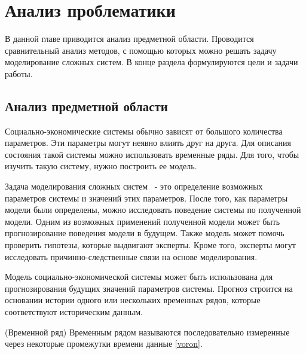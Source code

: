 

\chapter{Анализ проблематики }
\label{chapter1}

\begin{annotation}
	В данной главе приводится анализ предметной области.
	Проводится сравнительный анализ методов, с помощью которых
	можно решать задачу моделирование сложных систем.
	В конце раздела формулируются цели и задачи работы.
\end{annotation}


\section{Анализ предметной области}

Социально-экономические системы обычно зависят от большого количества параметров.
Эти параметры могут неявно влиять друг на друга. Для описания состояния такой системы
можно использовать временные ряды. Для того, чтобы изучить такую систему, нужно построить ее модель.

Задача моделирования сложных систем ~- это определение возможных параметров
системы и значений этих параметров. После того, как параметры модели были определены,
можно исследовать поведение системы по полученной модели. Одним из возможных
применений полученной модели может быть прогнозирование поведения модели в будущем.
Также модель может помочь проверить гипотезы, которые выдвигают эксперты.
Кроме того, эксперты могут исследовать причинно-следственные связи на основе моделирования.

Модель социально-экономической системы может быть использована
для прогнозирования будущих значений параметров системы. Прогноз строится на основании
истории одного или нескольких временных рядов, которые соответствуют историческим данным.

\begin{definition}
	(Временной ряд)
	Временным рядом называются последовательно измеренные через некоторые промежутки времени данные \ref{voron}.
\end{definition}


